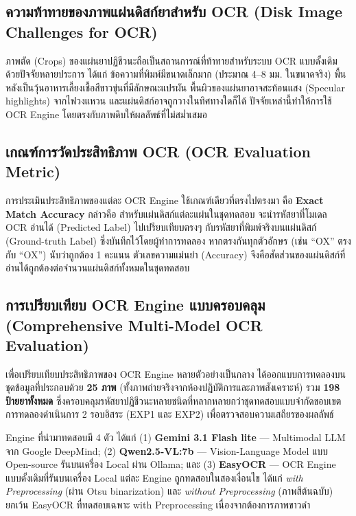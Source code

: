 \subsection{ความท้าทายของภาพแผ่นดิสก์ยาสำหรับ OCR (Disk Image Challenges for OCR)}

ภาพตัด (Crops) ของแผ่นยาปฏิชีวนะถือเป็นสถานการณ์ที่ท้าทายสำหรับระบบ OCR แบบดั้งเดิม ด้วยปัจจัยหลายประการ ได้แก่ ข้อความที่พิมพ์มีขนาดเล็กมาก (ประมาณ 4--8 มม. ในขนาดจริง) พื้นหลังเป็นวุ้นอาหารเลี้ยงเชื้อสีขาวขุ่นที่มีลักษณะแปรผัน พื้นผิวของแผ่นยาอาจสะท้อนแสง (Specular highlights) จากไฟวงแหวน และแผ่นดิสก์อาจถูกวางในทิศทางใดก็ได้ ปัจจัยเหล่านี้ทำให้การใช้ OCR Engine โดยตรงกับภาพดิบให้ผลลัพธ์ที่ไม่สม่ำเสมอ

\subsection{เกณฑ์การวัดประสิทธิภาพ OCR (OCR Evaluation Metric)}

การประเมินประสิทธิภาพของแต่ละ OCR Engine ใช้เกณฑ์เดียวที่ตรงไปตรงมา คือ \textbf{Exact Match Accuracy} กล่าวคือ สำหรับแผ่นดิสก์แต่ละแผ่นในชุดทดสอบ จะนำรหัสยาที่โมเดล OCR อ่านได้ (Predicted Label) ไปเปรียบเทียบตรงๆ กับรหัสยาที่พิมพ์จริงบนแผ่นดิสก์ (Ground-truth Label) ซึ่งบันทึกไว้โดยผู้ทำการทดลอง หากตรงกันทุกตัวอักษร (เช่น ``OX'' ตรงกับ ``OX'') นับว่าถูกต้อง 1 คะแนน ตัวเลขความแม่นยำ (Accuracy) จึงคือสัดส่วนของแผ่นดิสก์ที่อ่านได้ถูกต้องต่อจำนวนแผ่นดิสก์ทั้งหมดในชุดทดสอบ
\subsection{การเปรียบเทียบ OCR Engine แบบครอบคลุม (Comprehensive Multi-Model OCR Evaluation)}
\label{subsec:ocr_multimodel}

เพื่อเปรียบเทียบประสิทธิภาพของ OCR Engine หลายตัวอย่างเป็นกลาง ได้ออกแบบการทดลองบนชุดข้อมูลที่ประกอบด้วย \textbf{25 ภาพ} (ทั้งภาพถ่ายจริงจากห้องปฏิบัติการและภาพสังเคราะห์) รวม \textbf{198 ป้ายยาทั้งหมด} ซึ่งครอบคลุมรหัสยาปฏิชีวนะหลายชนิดที่หลากหลายกว่าชุดทดสอบแบบจำกัดขอบเขต การทดลองดำเนินการ 2 รอบอิสระ (EXP1 และ EXP2) เพื่อตรวจสอบความเสถียรของผลลัพธ์

Engine ที่นำมาทดสอบมี 4 ตัว ได้แก่ (1) \textbf{Gemini 3.1 Flash lite} \cite{google2025gemini} --- Multimodal LLM จาก Google DeepMind; (2) \textbf{Qwen2.5-VL:7b} \cite{qwen2025vl} --- Vision-Language Model แบบ Open-source รันบนเครื่อง Local ผ่าน Ollama; และ (3) \textbf{EasyOCR} \cite{jaidedai2024easyocr} --- OCR Engine แบบดั้งเดิมที่รันบนเครื่อง Local แต่ละ Engine ถูกทดสอบในสองเงื่อนไข ได้แก่ \emph{with Preprocessing} (ผ่าน Otsu binarization) และ \emph{without Preprocessing} (ภาพสีต้นฉบับ) ยกเว้น EasyOCR ที่ทดสอบเฉพาะ with Preprocessing เนื่องจากต้องการภาพขาวดำ

